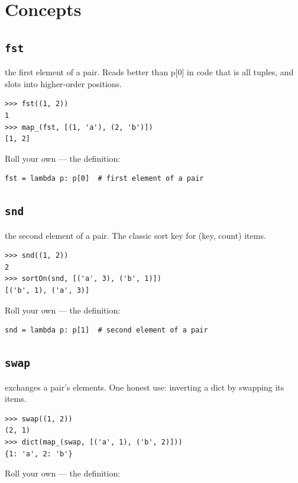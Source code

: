 \documentclass[10pt,letterpaper]{book}
\begin{document}
\section{Concepts}
\subsection{\texttt{fst}}\label{def:fst}
the first element of a pair. Reads better than p[0] in code that is all tuples, and slots into higher-order positions.
\begin{lstlisting}[style=ex]
>>> fst((1, 2))
1
>>> map_(fst, [(1, 'a'), (2, 'b')])
[1, 2]
\end{lstlisting}

Roll your own --- the definition:

\begin{lstlisting}[style=ex]
fst = lambda p: p[0]  # first element of a pair
\end{lstlisting}

\subsection{\texttt{snd}}\label{def:snd}
the second element of a pair. The classic sort key for (key, count) items.
\begin{lstlisting}[style=ex]
>>> snd((1, 2))
2
>>> sortOn(snd, [('a', 3), ('b', 1)])
[('b', 1), ('a', 3)]
\end{lstlisting}

Roll your own --- the definition:

\begin{lstlisting}[style=ex]
snd = lambda p: p[1]  # second element of a pair
\end{lstlisting}

\subsection{\texttt{swap}}\label{def:swap}
exchanges a pair's elements. One honest use: inverting a dict by swapping its items.
\begin{lstlisting}[style=ex]
>>> swap((1, 2))
(2, 1)
>>> dict(map_(swap, [('a', 1), ('b', 2)]))
{1: 'a', 2: 'b'}
\end{lstlisting}

Roll your own --- the definition:
\end{document}
